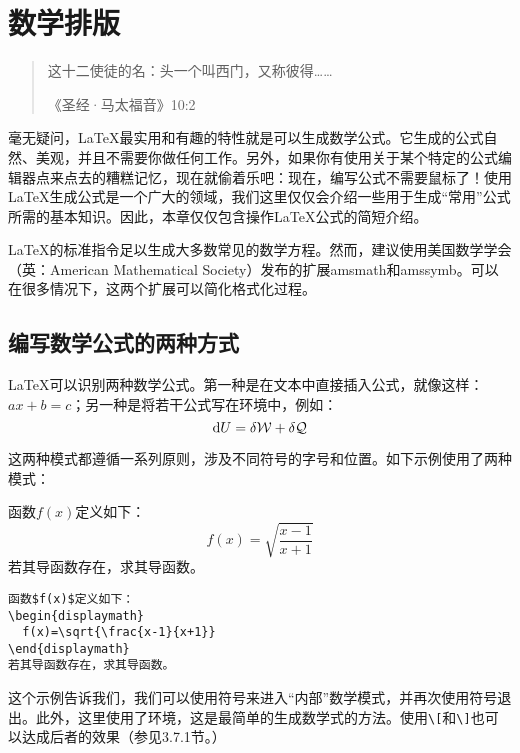 \chapter{数学排版}

\begin{quote}
  这十二使徒的名：头一个叫西门，又称彼得……
  
  \hfill《圣经·马太福音》10:2
\end{quote}

毫无疑问，\LaTeX 最实用和有趣的特性就是可以生成数学公式。它生成的公式自然、美观，并且不需要你做任何工作。另外，如果你有使用关于某个特定的公式编辑器点来点去的糟糕记忆，现在就偷着乐吧：现在，编写公式不需要鼠标了！使用\LaTeX 生成公式是一个广大的领域，我们这里仅仅会介绍一些用于生成“常用”公式所需的基本知识。因此，本章仅仅包含操作\LaTeX 公式的简短介绍。

\begin{ii}
\LaTeX 的标准指令足以生成大多数常见的数学方程。然而，建议使用美国数学学会（英：American Mathematical Society）发布的扩展amsmath和amssymb。可以在很多情况下，这两个扩展可以简化格式化过程。
\end{ii}

\section{编写数学公式的两种方式}

\LaTeX 可以识别两种数学公式。第一种是在文本中直接插入公式，就像这样：$ax+b=c$；另一种是将若干公式写在环境中，例如：
$$
{\rm d} U = \delta \mathcal{W} +\delta \mathcal{Q} 
$$

这两种模式都遵循一系列原则，涉及不同符号的字号和位置。如下示例使用了两种模式：

\begin{codelist}[3.1]{
  函数$f(x)$定义如下：
\begin{displaymath}
  f(x)=\sqrt{\frac{x-1}{x+1}}
\end{displaymath}
若其导函数存在，求其导函数。
}\begin{verbatim}
函数$f(x)$定义如下：
\begin{displaymath}
  f(x)=\sqrt{\frac{x-1}{x+1}}
\end{displaymath}
若其导函数存在，求其导函数。
\end{verbatim}
\end{codelist}

这个示例告诉我们，我们可以使用\dm{\$}符号来进入“内部”数学模式，并再次使用\dm{\$}符号退出。此外，这里使用了环境，这是最简单的生成数学式的方法。使用\verb|\[|和\verb|\]|也可以达成后者的效果（参见3.7.1节。）

